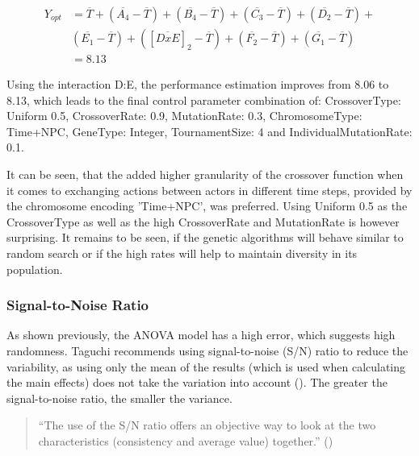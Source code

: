 \begin{equation}
	\begin{split}
		Y_{opt} &= \overline{T} + (\overline{A_4} - \overline{T}) + (\overline{B_4} - \overline{T}) + (\overline{C_3} - \overline{T}) + (\overline{D_2} - \overline{T}) + \\& (\overline{E_1} - \overline{T})  + ([\overline{DxE}]_2 - \overline{T})  + (\overline{F_2} - \overline{T}) + (\overline{G_1} - \overline{T}) \\
		&= 8.13
	\end{split}
	 \label{equ:hyperparameter_tuning:optimum_perf_included_interaction}
\end{equation}

Using the interaction D:E, the performance estimation improves from 8.06 to 8.13, which leads to the final control parameter combination of:
CrossoverType: Uniform 0.5, CrossoverRate: 0.9, MutationRate: 0.3, ChromosomeType: Time+NPC, GeneType: Integer, TournamentSize: 4 and IndividualMutationRate: 0.1.

It can be seen, that the added higher granularity of the crossover function when it comes to exchanging actions between actors in different time steps, provided by the chromosome encoding 'Time+NPC', was preferred. Using Uniform 0.5 as the CrossoverType as well as the high CrossoverRate and MutationRate is however surprising. It remains to be seen, if the genetic algorithms will behave similar to random search or if the high rates will help to maintain diversity in its population.

\subsubsection{Signal-to-Noise Ratio}
As shown previously, the ANOVA model has a high error, which suggests high randomness. Taguchi recommends using signal-to-noise (S/N) ratio to reduce the variability, as using only the mean of the results (which is used when calculating the main effects) does not take the variation into account (\cite{roy_primer_1990}). The greater the signal-to-noise ratio, the smaller the variance.

\begin{quote}
	\begin{em}
		\enquote{The use of the S/N ratio offers an objective way to look at the two characteristics (consistency and average value) together.} (\cite{roy_primer_1990})
	\end{em}
\end{quote}

